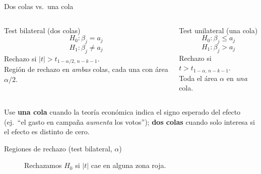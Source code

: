\documentclass{beamer}
\begin{document}
\begin{frame}{Dos colas vs.\ una cola}
\begin{columns}
\begin{block}{Test bilateral (dos colas)}
\[ H_0:\beta_j = a_j \]
\[ H_1:\beta_j \neq a_j \]
Rechazo si $|t| > t_{1-\alpha/2,\,n-k-1}$.\\
Región de rechazo en \emph{ambas} colas, cada una con área $\alpha/2$.
\end{block}

\begin{alertblock}{Test unilateral (una cola)}
\[ H_0:\beta_j \leq a_j \]
\[ H_1:\beta_j > a_j \]
Rechazo si $t > t_{1-\alpha,\,n-k-1}$.\\
Toda el área $\alpha$ en \emph{una} cola.
\end{alertblock}
\end{columns}

\medskip
{\small Use \textbf{una cola} cuando la teoría económica indica el signo esperado del efecto (ej.\ ``el gasto en campaña \emph{aumenta} los votos''); \textbf{dos colas} cuando solo interesa si el efecto es distinto de cero.}
\end{frame}

\begin{frame}{Regiones de rechazo (test bilateral, $\alpha$)}
\begin{figure}
\centering
{}
\caption{Rechazamos $H_0$ si $|t|$ cae en alguna zona roja.}
\end{figure}
\end{frame}
\end{document}
